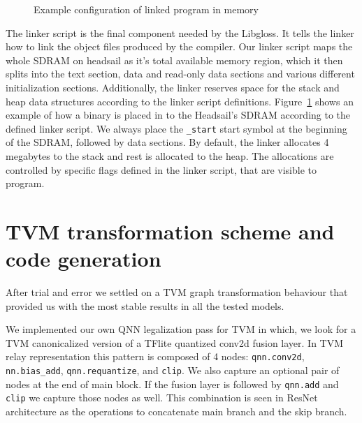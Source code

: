 \documentclass[12pt,a4paper,english
]{tunithesis}
\begin{document}
\begin{figure}[h]
\centering
{}
\caption{Example configuration of linked program in memory}
\label{fig:sdram-memory-layout}
\end{figure}

The linker script is the final component needed by the Libgloss. It tells the linker how to link the object files produced by the compiler. Our linker script maps the whole SDRAM on headsail as it's total available memory region, which it then splits into the text section, data and read-only data sections and various different initialization sections. Additionally, the linker reserves space for the stack and heap data structures according to the linker script definitions. Figure~\ref{fig:sdram-memory-layout} shows an example of how a binary is placed in to the Headsail's SDRAM according to the defined linker script. We always place the \texttt{\_start} start symbol at the beginning of the SDRAM, followed by data sections. By default, the linker allocates 4 megabytes to the stack and rest is allocated to the heap. The allocations are controlled by specific flags defined in the linker script, that are visible to program.


\section{TVM transformation scheme and code generation}
After trial and error we settled on a TVM graph transformation behaviour that provided us with the most stable results in all the tested models.

We implemented our own QNN legalization pass for TVM in which, we look for a TVM canonicalized version of a TFlite quantized conv2d fusion layer. In TVM relay representation this pattern is composed of 4 nodes: \texttt{qnn.conv2d}, \texttt{nn.bias\_add}, \texttt{qnn.requantize}, and \texttt{clip}. We also capture an optional pair of nodes at the end of main block. If the fusion layer is followed by \texttt{qnn.add} and \texttt{clip} we capture those nodes as well. This combination is seen in ResNet architecture as the operations to concatenate main branch and the skip branch.
\end{document}

